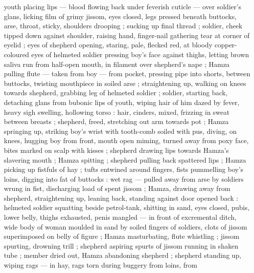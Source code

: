 youth placing lips --- blood flowing back under feverish cuticle --- over soldier's glans, licking film of grimy jissom, eyes closed, legs pressed beneath buttocks, arse, throat, sticky, shoulders drooping ; sucking up final thread ; soldier, cheek tipped down against shoulder, raising hand, finger-nail gathering tear at corner of eyelid ; eyes of shepherd opening, staring, pale, flecked red, at bloody copper-coloured eyes of helmeted soldier pressing boy's face against thighs, letting brown saliva run from half-open mouth, in filament over shepherd's nape ; Hamza pulling flute --- taken from boy --- from pocket, pressing pipe into shorts, between buttocks, twisting mouthpiece in soiled arse ; straightening up, walking on knees towards shepherd, grabbing leg of helmeted soldier  ; soldier, starting back, detaching glans from bubonic lips of youth, wiping hair of him dazed by fever, heavy sigh swelling, hollowing torso : hair, cinders, mixed, frizzing in sweat between breasts ; shepherd, freed, stretching out arm towards pot ; Hamza springing up, striking boy's wrist with tooth-comb soiled with pus, diving, on knees, hugging boy from front, mouth open miming, turned away from poxy face, bites marked on scalp with kisses ; shepherd drawing lips towards Hamza's slavering mouth ; Hamza spitting ; shepherd pulling back spattered lips ; Hamza picking up fistfuls of hay ; tufts entwined around fingers, fists pummelling boy's loins, digging into fat of buttocks : wet rag --- pulled away from arse by soldiers {\dashcom} wrung in fist, discharging load of spent jissom ; Hamza, drawing away from shepherd, straightening up, leaning back, standing against door opened back : helmeted soldier squatting beside petrol-tank, shitting in sand, eyes closed, pubis, lower belly, thighs exhausted, penis mangled --- in front of excremental ditch, wide body of woman moulded in sand by soiled fingers of soldiers, clots of jissom superimposed on belly of figure ; Hamza masturbating, flute whistling ; jissom spurting, drowning trill ; shepherd aspiring spurts of jissom running in shaken tube ; member dried out, Hamza abandoning shepherd ; shepherd standing up, wiping rags --- in hay, rags torn during buggery from loins, from 
